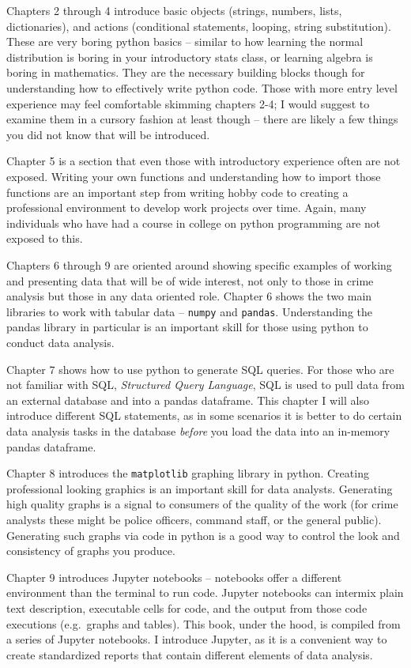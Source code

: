 \documentclass[
  letterpaper,
]{scrbook}
\begin{document}
Chapters 2 through 4 introduce basic objects (strings, numbers, lists,
dictionaries), and actions (conditional statements, looping, string
substitution). These are very boring python basics -- similar to how
learning the normal distribution is boring in your introductory stats
class, or learning algebra is boring in mathematics. They are the
necessary building blocks though for understanding how to effectively
write python code. Those with more entry level experience may feel
comfortable skimming chapters 2-4; I would suggest to examine them in a
cursory fashion at least though -- there are likely a few things you did
not know that will be introduced.

Chapter 5 is a section that even those with introductory experience
often are not exposed. Writing your own functions and understanding how
to import those functions are an important step from writing hobby code
to creating a professional environment to develop work projects over
time. Again, many individuals who have had a course in college on python
programming are not exposed to this.

Chapters 6 through 9 are oriented around showing specific examples of
working and presenting data that will be of wide interest, not only to
those in crime analysis but those in any data oriented role. Chapter 6
shows the two main libraries to work with tabular data -- \texttt{numpy}
and \texttt{pandas}. Understanding the pandas library in particular is
an important skill for those using python to conduct data analysis.

Chapter 7 shows how to use python to generate SQL queries. For those who
are not familiar with SQL, \emph{Structured Query Language}, SQL is used
to pull data from an external database and into a pandas dataframe. This
chapter I will also introduce different SQL statements, as in some
scenarios it is better to do certain data analysis tasks in the database
\emph{before} you load the data into an in-memory pandas dataframe.

Chapter 8 introduces the \texttt{matplotlib} graphing library in python.
Creating professional looking graphics is an important skill for data
analysts. Generating high quality graphs is a signal to consumers of the
quality of the work (for crime analysts these might be police officers,
command staff, or the general public). Generating such graphs via code
in python is a good way to control the look and consistency of graphs
you produce.

Chapter 9 introduces Jupyter notebooks -- notebooks offer a different
environment than the terminal to run code. Jupyter notebooks can
intermix plain text description, executable cells for code, and the
output from those code executions (e.g.~graphs and tables). This book,
under the hood, is compiled from a series of Jupyter notebooks. I
introduce Jupyter, as it is a convenient way to create standardized
reports that contain different elements of data analysis.
\end{document}
